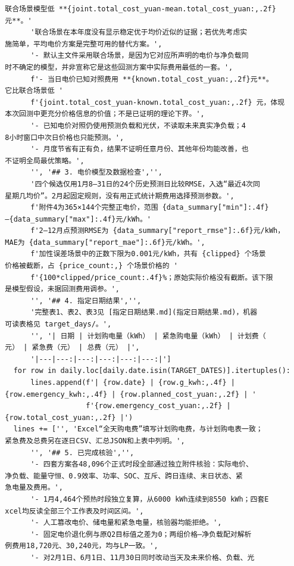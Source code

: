 \begin{verbatim}
  联合场景模型低 **{joint.total_cost_yuan-mean.total_cost_yuan:,.2f}
  元**。'
        '联合场景在本年度没有显示稳定优于均价近似的证据；若优先考虑实
  施简单，平均电价方案是完整可用的替代方案。',
        '- 默认主文件采用联合场景，是因为它对应所声明的电价与净负载同
  时不确定的模型，并非宣称它是这些回测方案中实际费用最低的一套。',
        f'- 当日电价已知对照费用 **{known.total_cost_yuan:,.2f}元**。
  它比联合场景低 '
        f'{joint.total_cost_yuan-known.total_cost_yuan:,.2f} 元，体现
  本次回测中更充分价格信息的价值；不是已证明的理论下界。',
        '- 已知电价对照仍使用预测负载和光伏，不读取未来真实净负载；4
  8小时窗口中次日价格也只能预测。',
        '- 月度节省有正有负，结果不证明任意月份、其他年份均能改善，也
  不证明全局最优策略。',
        '', '## 3. 电价模型及数据检查','',
        '四个候选仅用1月8—31日的24个历史预测日比较RMSE，入选“最近4次同
  星期几均价”。2月起固定规则，没有用正式统计期费用选择预测参数。',
        f'附件4为365×144个完整正电价，范围 {data_summary["min"]:.4f}
  —{data_summary["max"]:.4f}元/kWh。'
        f'2—12月点预测RMSE为 {data_summary["report_rmse"]:.6f}元/kWh，
  MAE为 {data_summary["report_mae"]:.6f}元/kWh。',
        f'加性误差场景中的正数下限为0.001元/kWh，共有 {clipped} 个场景
  价格被截断，占 {price_count:,} 个场景价格的 '
        f'{100*clipped/price_count:.4f}%；原始实际价格没有截断。该下限
  是模型假设，未据回测费用调参。',
        '', '## 4. 指定日期结果','',
        '完整表1、表2、表3见 [指定日期结果.md](指定日期结果.md)，机器
  可读表格见 target_days/。',
        '', '| 日期 | 计划购电量（kWh） | 紧急购电量（kWh） | 计划费（
  元） | 紧急费（元） | 总费（元） |',
        '|---|---:|---:|---:|---:|---:|']
    for row in daily.loc[daily.date.isin(TARGET_DATES)].itertuples():
        lines.append(f'| {row.date} | {row.g_kwh:,.4f} |
  {row.emergency_kwh:,.4f} | {row.planned_cost_yuan:,.2f} | '
                     f'{row.emergency_cost_yuan:,.2f} |
  {row.total_cost_yuan:,.2f} |')
    lines += ['', 'Excel“全天购电费”填写计划购电费，与计划购电表一致；
  紧急费及总费另在逐日CSV、汇总JSON和上表中列明。',
        '', '## 5. 已完成核验','',
        '- 四套方案各48,096个正式时段全部通过独立附件核验：实际电价、
  净负载、能量守恒、0.9效率、功率、SOC、互斥、跨日连续、末日状态、紧
  急电量及费用。',
        '- 1月4,464个预热时段独立复算，从6000 kWh连续到8550 kWh；四套E
  xcel均反读全部三个工作表及时间区间。',
        '- 人工篡改电价、储电量和紧急电量，核验器均能拒绝。',
        '- 固定电价退化例与原Q2目标值之差为0；两组价格—净负载配对解析
  例费用18,720元、30,240元，均与LP一致。',
        '- 对2月1日、6月1日、11月30日同时改动当天及未来价格、负载、光

\end{verbatim}
